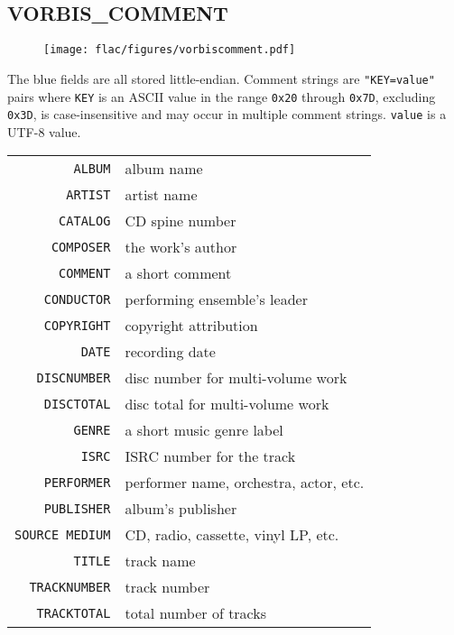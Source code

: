 \subsection{VORBIS\_COMMENT}
\begin{figure}[h]
\texttt{[image: flac/figures/vorbiscomment.pdf]}
\end{figure}
\par
\noindent
The blue fields are all stored little-endian.
Comment strings are \texttt{"KEY=value"} pairs
where \texttt{KEY} is an ASCII value in the range \texttt{0x20}
through \texttt{0x7D}, excluding \texttt{0x3D},
is case-insensitive and may occur in multiple comment strings.
\texttt{value} is a UTF-8 value.
\begin{table}[h]
  {
    \begin{tabular}{rl}
      \texttt{ALBUM} & album name \\
      \texttt{ARTIST} & artist name \\
      \texttt{CATALOG} & CD spine number \\
      \texttt{COMPOSER} & the work's author \\
      \texttt{COMMENT} & a short comment \\
      \texttt{CONDUCTOR} & performing ensemble's leader \\
      \texttt{COPYRIGHT} & copyright attribution \\
      \texttt{DATE} & recording date \\
      \texttt{DISCNUMBER} & disc number for multi-volume work \\
      \texttt{DISCTOTAL} & disc total for multi-volume work \\
      \texttt{GENRE} & a short music genre label \\
      \texttt{ISRC} & ISRC number for the track \\
      \texttt{PERFORMER} & performer name, orchestra, actor, etc. \\
      \texttt{PUBLISHER} & album's publisher \\
      \texttt{SOURCE MEDIUM} & CD, radio, cassette, vinyl LP, etc. \\
      \texttt{TITLE} & track name \\
      \texttt{TRACKNUMBER} & track number \\
      \texttt{TRACKTOTAL} & total number of tracks \\
    \end{tabular}
  }
\end{table}

